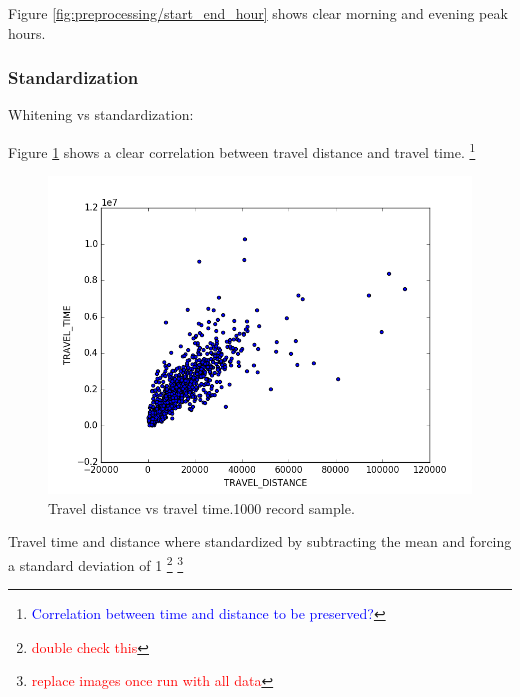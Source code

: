 \documentclass{article}
\newcommand{\selfnote}[1]{\footnote{\textcolor{red}{#1}}}
\newcommand{\technicalDoubt}[1]{\footnote{\textcolor{blue}{#1}}}
\begin{document}
Figure \ref{fig:preprocessing/start_end_hour} shows clear morning and evening peak hours. 

\subsubsection{Standardization}
Whitening vs standardization: 

Figure \ref{fig:preprocessing/distance_time_correlation} shows a clear correlation between travel distance and travel time. \technicalDoubt{Correlation between time and distance to be preserved?}

\begin{figure}
  \centering
  \includegraphics[width=.8\linewidth]{./images/distance_vs_time.png}
  \caption{Travel distance vs travel time.1000 record sample.}
  \label{fig:preprocessing/distance_time_correlation}
\end{figure}

Travel time and distance where standardized by subtracting the mean and forcing a standard deviation of 1 \selfnote{double check this} \selfnote{replace images once run with all data}
\end{document}
